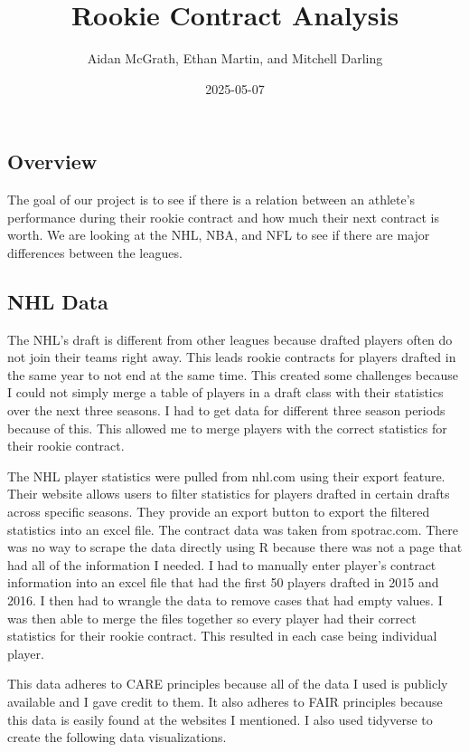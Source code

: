 \documentclass[
  letterpaper,
  DIV=11,
  numbers=noendperiod]{scrartcl}
\title{Rookie Contract Analysis}
\author{Aidan McGrath, Ethan Martin, and Mitchell Darling}
\date{2025-05-07}
\begin{document}
\maketitle


\subsection{Overview}\label{overview}

The goal of our project is to see if there is a relation between an
athlete's performance during their rookie contract and how much their
next contract is worth. We are looking at the NHL, NBA, and NFL to see
if there are major differences between the leagues.

\subsection{NHL Data}\label{nhl-data}

The NHL's draft is different from other leagues because drafted players
often do not join their teams right away. This leads rookie contracts
for players drafted in the same year to not end at the same time. This
created some challenges because I could not simply merge a table of
players in a draft class with their statistics over the next three
seasons. I had to get data for different three season periods because of
this. This allowed me to merge players with the correct statistics for
their rookie contract.

The NHL player statistics were pulled from nhl.com using their export
feature. Their website allows users to filter statistics for players
drafted in certain drafts across specific seasons. They provide an
export button to export the filtered statistics into an excel file. The
contract data was taken from spotrac.com. There was no way to scrape the
data directly using R because there was not a page that had all of the
information I needed. I had to manually enter player's contract
information into an excel file that had the first 50 players drafted in
2015 and 2016. I then had to wrangle the data to remove cases that had
empty values. I was then able to merge the files together so every
player had their correct statistics for their rookie contract. This
resulted in each case being individual player.

This data adheres to CARE principles because all of the data I used is
publicly available and I gave credit to them. It also adheres to FAIR
principles because this data is easily found at the websites I
mentioned. I also used tidyverse to create the following data
visualizations.
\end{document}
